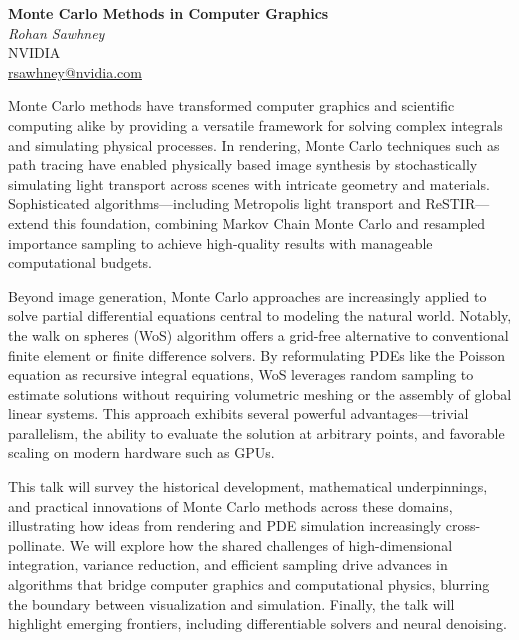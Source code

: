 \documentclass[12pt,a4paper,figuresright]{book}
\newenvironment{talk}[6]%
 {%
  \vskip 0pt\nopagebreak%
 \vskip 0pt\nopagebreak%
  \textbf{#1}\vspace{3mm}\\\nopagebreak%
  \textit{#2}\\\nopagebreak%
  #3\\\nopagebreak%
  \url{#4}\vspace{3mm}\\\nopagebreak%
  \ifthenelse{\equal{#5}{}}{}{Coauthor(s): #5\vspace{3mm}\\\nopagebreak}%
  \ifthenelse{\equal{#6}{}}{}{Special session: #6\quad \vspace{3mm}\\\nopagebreak}%
 }
 {\vspace{1cm}\nopagebreak}%
\begin{document}
	
\begin{talk}
  {Monte Carlo Methods in Computer Graphics}%
  {Rohan Sawhney}%
  {NVIDIA}%
  {rsawhney@nvidia.com}%
  {}%
  {}%
			
Monte Carlo methods have transformed computer graphics and scientific computing alike by providing a versatile framework for solving complex integrals and simulating physical processes. In rendering, Monte Carlo techniques such as path tracing have enabled physically based image synthesis by stochastically simulating light transport across scenes with intricate geometry and materials. Sophisticated algorithms---including Metropolis light transport and ReSTIR---extend this foundation, combining Markov Chain Monte Carlo and resampled importance sampling to achieve high-quality results with manageable computational budgets.

Beyond image generation, Monte Carlo approaches are increasingly applied to solve partial differential equations central to modeling the natural world. Notably, the walk on spheres (WoS) algorithm offers a grid-free alternative to conventional finite element or finite difference solvers. By reformulating PDEs like the Poisson equation as recursive integral equations, WoS leverages random sampling to estimate solutions without requiring volumetric meshing or the assembly of global linear systems. This approach exhibits several powerful advantages---trivial parallelism, the ability to evaluate the solution at arbitrary points, and favorable scaling on modern hardware such as GPUs.

This talk will survey the historical development, mathematical underpinnings, and practical innovations of Monte Carlo methods across these domains, illustrating how ideas from rendering and PDE simulation increasingly cross-pollinate. We will explore how the shared challenges of high-dimensional integration, variance reduction, and efficient sampling drive advances in algorithms that bridge computer graphics and computational physics, blurring the boundary between visualization and simulation. Finally, the talk will highlight emerging frontiers, including differentiable solvers and neural denoising.



\end{talk}
\end{document}
